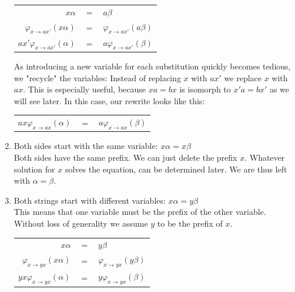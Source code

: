 \begin{enumerate}
        \begin{center}
        \begin{tabular}{r c l}
            $x\alpha$ & $=$ & $a\beta$ \\
            $\varphi_{x \rightarrow ax'}(x\alpha)$ & $=$ & $\varphi_{x \rightarrow ax'}(a\beta)$ \\
            $ax'\varphi_{x \rightarrow ax'}(\alpha)$ & $=$ & $a\varphi_{x \rightarrow ax'}(\beta)$ \\
        \end{tabular}
        \end{center}
        
        As introducing a new variable for each substitution quickly becomes tedious, we "recycle" the variables: Instead of replacing $x$ with $ax'$ we replace $x$ with $ax$. This is especially useful, because $xa = bx$ is isomorph to $x'a = bx'$ as we will see later. In this case, our rewrite looks like this:
        
        \begin{center}
        \begin{tabular}{r c l}
            $ax\varphi_{x \rightarrow ax}(\alpha)$ & $=$ & $a\varphi_{x \rightarrow ax}(\beta)$ \\
        \end{tabular}
        \end{center}
    
    \item \label{def:nt_xx}
        Both sides start with the same variable: $x\alpha = x\beta$ \\
        Both sides have the same prefix. We can just delete the prefix $x$. Whatever solution for $x$ solves the equation, can be determined later.
        We are thus left with $\alpha = \beta$.
        
    \item \label{def:nt_xy}
        Both strings start with different variables: $x\alpha = y\beta$ \\
        This means that one variable must be the prefix of the other variable. Without loss of generality we assume $y$ to be the prefix of $x$.
        
        \begin{center}
        \begin{tabular}{r c l}
            $x\alpha$ & $=$ & $y\beta$ \\
            $\varphi_{x \rightarrow yx}(x\alpha)$ & $=$ & $\varphi_{x \rightarrow yx}(y\beta)$ \\
            $yx\varphi_{x \rightarrow yx}(\alpha)$ & $=$ & $y\varphi_{x \rightarrow yx}(\beta)$ \\
        \end{tabular}
        \end{center}
\end{enumerate}

